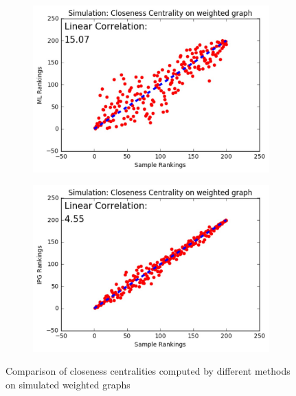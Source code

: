 \documentclass[10pt]{beamer}
\begin{document}
\begin{frame}
\begin{figure}[H]
\begin{subfigure}{.32\textwidth}
    \includegraphics[width=0.95\linewidth]{CCW_ML.jpeg}
\end{subfigure}
\begin{subfigure}{.32\textwidth}
	\centering
    \includegraphics[width=0.95\linewidth]{CCW_IPG.jpeg}
\end{subfigure}
\caption{Comparison of closeness centralities computed by different methods on simulated weighted graphs}
\end{figure}
\end{frame}
\end{document}
